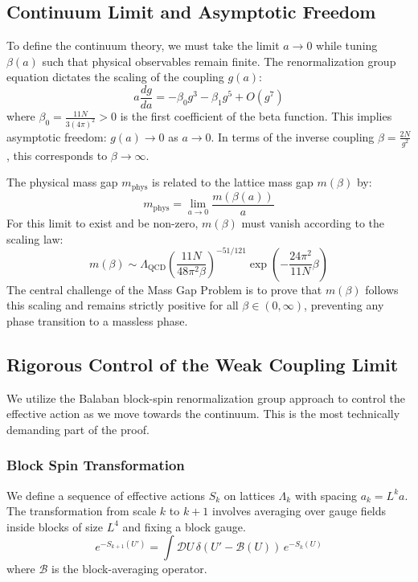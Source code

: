 \subsection{Continuum Limit and Asymptotic Freedom}

To define the continuum theory, we must take the limit $a \to 0$ while tuning $\beta(a)$ such that physical observables remain finite. The renormalization group equation dictates the scaling of the coupling $g(a)$:
\begin{equation}
    a \frac{dg}{da} = -\beta_0 g^3 - \beta_1 g^5 + O(g^7)
\end{equation}
where $\beta_0 = \frac{11N}{3(4\pi)^2} > 0$ is the first coefficient of the beta function. This implies asymptotic freedom: $g(a) \to 0$ as $a \to 0$.
In terms of the inverse coupling $\beta = \frac{2N}{g^2}$, this corresponds to $\beta \to \infty$.

The physical mass gap $m_{\text{phys}}$ is related to the lattice mass gap $m(\beta)$ by:
\begin{equation}
    m_{\text{phys}} = \lim_{a \to 0} \frac{m(\beta(a))}{a}
\end{equation}
For this limit to exist and be non-zero, $m(\beta)$ must vanish according to the scaling law:
\begin{equation}
    m(\beta) \sim \Lambda_{\text{QCD}} \left( \frac{11N}{48\pi^2 \beta} \right)^{-51/121} \exp\left( -\frac{24\pi^2}{11N} \beta \right)
\end{equation}
The central challenge of the Mass Gap Problem is to prove that $m(\beta)$ follows this scaling and remains strictly positive for all $\beta \in (0, \infty)$, preventing any phase transition to a massless phase.

\subsection{Rigorous Control of the Weak Coupling Limit}

We utilize the Balaban block-spin renormalization group approach to control the effective action as we move towards the continuum. This is the most technically demanding part of the proof.

\subsubsection{Block Spin Transformation}
We define a sequence of effective actions $S_k$ on lattices $\Lambda_k$ with spacing $a_k = L^k a$. The transformation from scale $k$ to $k+1$ involves averaging over gauge fields inside blocks of size $L^4$ and fixing a block gauge.
\begin{equation}
    e^{-S_{k+1}(U')} = \int \mathcal{D}U \, \delta(U' - \mathcal{B}(U)) \, e^{-S_k(U)}
\end{equation}
where $\mathcal{B}$ is the block-averaging operator.

